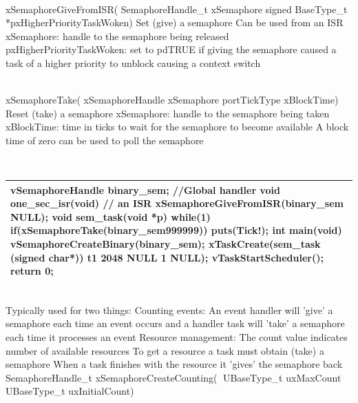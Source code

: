 \begin{description}
\os{\newpage}



\item[{\rot\bf Set a Binary Semaphore}]~\\[-3ex]
\bi
\ite xSemaphoreGiveFromISR(
\ite   SemaphoreHandle_t xSemaphore
\ite   signed BaseType_t *pxHigherPriorityTaskWoken)
\ite
\ite Set (give) a semaphore
\bi
\ite Can be used from an ISR
\ite xSemaphore: handle to the semaphore being released
\ite pxHigherPriorityTaskWoken: set to pdTRUE if giving the semaphore caused a task of a higher priority to unblock causing a context switch
\ei
\ei

\os{\newpage}



\item[{\rot\bf Reset a Binary Semaphore}]~\\[-3ex]
\bi
\ite xSemaphoreTake(	xSemaphoreHandle xSemaphore
\ite        	portTickType xBlockTime)
\ite
\ite Reset (take) a semaphore
\bi
\ite xSemaphore: handle to the semaphore being taken
\ite xBlockTime: time in ticks to wait for the semaphore to become available
\bi
\ite A block time of zero can be used to poll the semaphore
\ei
\ei
\ei

\os{\newpage}



\item[{\rot\bf Example of Binary Semaphores}]~\\[-3ex]
\begin{tabular}{|l|} \hline
vSemaphoreHandle binary_sem; //Global handler
void one_sec_isr(void){ // an ISR
  xSemaphoreGiveFromISR(binary_sem NULL);		
}
void sem_task(void *p){
  while(1)
    if(xSemaphoreTake(binary_sem999999)) puts(Tick!);
}
int main(void){
    vSemaphoreCreateBinary(binary_sem);
    xTaskCreate(sem_task (signed char*)) t1 2048
         NULL 1 NULL);
    vTaskStartScheduler();
    return 0;	
}  \\ \hline
\end{tabular}


\os{\newpage}



\item[{\rot\bf Counting Semaphores}]~\\[-3ex]
\bi
\ite Typically used for two things:
\ite Counting events:
\bi
\ite An event handler will 'give' a semaphore each time an event occurs and a handler task will 'take' a semaphore each time it processes an event
\ei
\ite Resource management:
\bi
\ite The count value indicates number of available resources
\ite To get a resource a task must obtain (take) a semaphore
\ite When a task finishes with the resource it 'gives' the semaphore back
\ei
\ite SemaphoreHandle_t xSemaphoreCreateCounting(     UBaseType_t uxMaxCount     UBaseType_t uxInitialCount)
\ei


\end{description}

